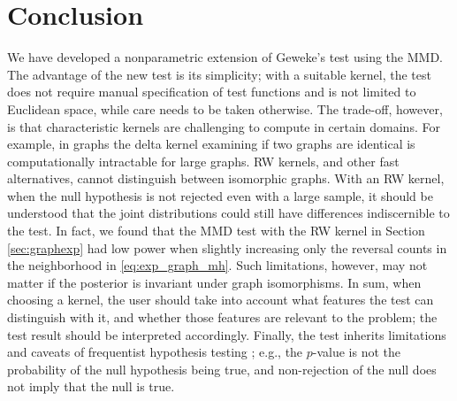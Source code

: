 \documentclass{article}
\begin{document}
\section{Conclusion}
\label{sec:conclusion}
We have developed a nonparametric extension of Geweke's test using the MMD.   
The advantage of the new test is its simplicity; with a suitable kernel, the test does not require manual specification of test functions and is not limited to Euclidean space, while care needs to be taken otherwise. The trade-off, however, is that characteristic kernels are challenging to compute in certain domains.
For example, in graphs the delta kernel examining if two graphs are identical is computationally intractable for large graphs. 
RW kernels, and other fast alternatives, cannot distinguish between isomorphic graphs. 
With an RW kernel, when the null hypothesis is not rejected even with a large sample, it should be understood that the joint distributions could still have differences indiscernible to the test. 
In fact, we found that the MMD test with the RW kernel in Section \ref{sec:graphexp} had low power when slightly increasing only the reversal counts in the neighborhood in \eqref{eq:exp_graph_mh}. 
Such limitations, however, may not matter if the posterior is invariant under graph isomorphisms. 
In sum, when choosing a kernel, the user should take into account what features the test can distinguish with it, and whether those features are relevant to the problem; the test result should be interpreted accordingly. 
Finally, the test inherits limitations and caveats of frequentist hypothesis testing \cite{lehmann_testing_2005, Wasserstein_2016}; e.g., the $p$-value is not the probability of the null hypothesis being true, and non-rejection of the null does not imply that the null is true. 
\end{document}
